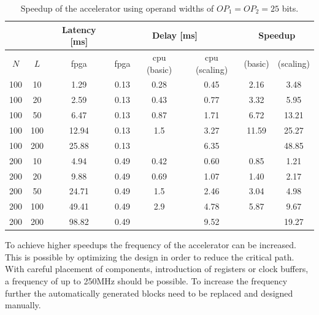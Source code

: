 \documentclass[mscthesis]{usiinfthesis}
\begin{document}
\begin{table}
    \footnotesize
    \begin{center}
    \begin{tabular}{|c|c|c|c|c|c|c|c|}
        \cline{3-8}
        \multicolumn{2}{c|}{} & Latency [ms]
        & \multicolumn{3}{c|}{Delay [ms]}
        & \multicolumn{2}{c|}{Speedup} \\
        \hline
        $N$ & $L$ & \acrshort{fpga} & \acrshort{fpga}
        & \acrshort{cpu} (basic)
        & \acrshort{cpu} (scaling) & (basic) & (scaling) \\
        \hline
        \hline
        100 & 10  & 1.29  & 0.13 & 0.28 & 0.45 & 2.16  & 3.48  \\
        100 & 20  & 2.59  & 0.13 & 0.43 & 0.77 & 3.32  & 5.95  \\
        100 & 50  & 6.47  & 0.13 & 0.87 & 1.71 & 6.72  & 13.21 \\
        \rowcolor{black!20}
        100 & 100 & 12.94 & 0.13 & 1.5  & 3.27 & 11.59 & 25.27 \\
        \rowcolor{black!25}
        100 & 200 & 25.88 & 0.13 &      & 6.35 &       & 48.85 \\
        200 & 10  & 4.94  & 0.49 & 0.42 & 0.60 & 0.85  & 1.21  \\
        200 & 20  & 9.88  & 0.49 & 0.69 & 1.07 & 1.40  & 2.17  \\
        \rowcolor{black!20}
        200 & 50  & 24.71 & 0.49 & 1.5  & 2.46 & 3.04  & 4.98  \\
        \rowcolor{black!20}
        200 & 100 & 49.41 & 0.49 & 2.9  & 4.78 & 5.87  & 9.67  \\
        \rowcolor{black!20}
        200 & 200 & 98.82 & 0.49 &      & 9.52 &       & 19.27 \\
        \hline
    \end{tabular}
    \end{center}
    \caption{Speedup of the accelerator using operand widths of
        $OP_1 = OP_2 = 25$ bits.}
    \label{tab:res_speed}
\end{table}

To achieve higher speedups the frequency of the accelerator can be increased.
This is possible by optimizing the design in order to reduce the critical
path. With careful placement of components, introduction of registers or clock
buffers, a frequency of up to 250MHz should be possible. To increase the
frequency further the automatically generated blocks need to be replaced and
designed manually.
\end{document}
